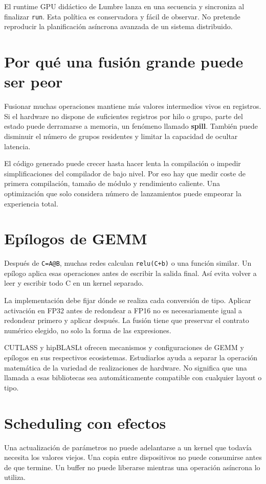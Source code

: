 \documentclass[12pt,a4paper,oneside]{report}
\begin{document}
El runtime GPU didáctico de Lumbre lanza en una secuencia y sincroniza al finalizar \texttt{run}. Esta política es conservadora y fácil de observar. No pretende reproducir la planificación asíncrona avanzada de un sistema distribuido.

\section{Por qué una fusión grande puede ser peor}
Fusionar muchas operaciones mantiene más valores intermedios vivos en registros. Si el hardware no dispone de suficientes registros por hilo o grupo, parte del estado puede derramarse a memoria, un fenómeno llamado \textbf{spill}. También puede disminuir el número de grupos residentes y limitar la capacidad de ocultar latencia.

El código generado puede crecer hasta hacer lenta la compilación o impedir simplificaciones del compilador de bajo nivel. Por eso hay que medir coste de primera compilación, tamaño de módulo y rendimiento caliente. Una optimización que solo considera número de lanzamientos puede empeorar la experiencia total.

\section{Epílogos de GEMM}
Después de \texttt{C=A@B}, muchas redes calculan \texttt{relu(C+b)} o una función similar. Un epílogo aplica esas operaciones antes de escribir la salida final. Así evita volver a leer y escribir todo C en un kernel separado.

La implementación debe fijar dónde se realiza cada conversión de tipo. Aplicar activación en FP32 antes de redondear a FP16 no es necesariamente igual a redondear primero y aplicar después. La fusión tiene que preservar el contrato numérico elegido, no solo la forma de las expresiones.

CUTLASS y hipBLASLt ofrecen mecanismos y configuraciones de GEMM y epílogos en sus respectivos ecosistemas. Estudiarlos ayuda a separar la operación matemática de la variedad de realizaciones de hardware. No significa que una llamada a esas bibliotecas sea automáticamente compatible con cualquier layout o tipo. \cite{cutlass,hipblaslt}

\section{Scheduling con efectos}
Una actualización de parámetros no puede adelantarse a un kernel que todavía necesita los valores viejos. Una copia entre dispositivos no puede consumirse antes de que termine. Un buffer no puede liberarse mientras una operación asíncrona lo utiliza.
\end{document}

